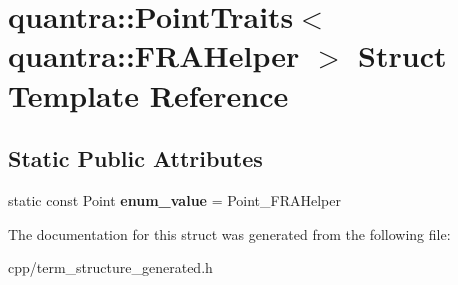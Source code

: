 \hypertarget{structquantra_1_1PointTraits_3_01quantra_1_1FRAHelper_01_4}{}\section{quantra\+:\+:Point\+Traits$<$ quantra\+:\+:F\+R\+A\+Helper $>$ Struct Template Reference}
\label{structquantra_1_1PointTraits_3_01quantra_1_1FRAHelper_01_4}
\subsection*{Static Public Attributes}
\begin{DoxyCompactItemize}
\item 
\mbox{\label{structquantra_1_1PointTraits_3_01quantra_1_1FRAHelper_01_4_ad121866a94170efa4e14a54a44cb7395}} 
static const Point {\bfseries enum\+\_\+value} = Point\+\_\+\+F\+R\+A\+Helper
\end{DoxyCompactItemize}


The documentation for this struct was generated from the following file\+:\begin{DoxyCompactItemize}
\item 
cpp/term\+\_\+structure\+\_\+generated.\+h\end{DoxyCompactItemize}
